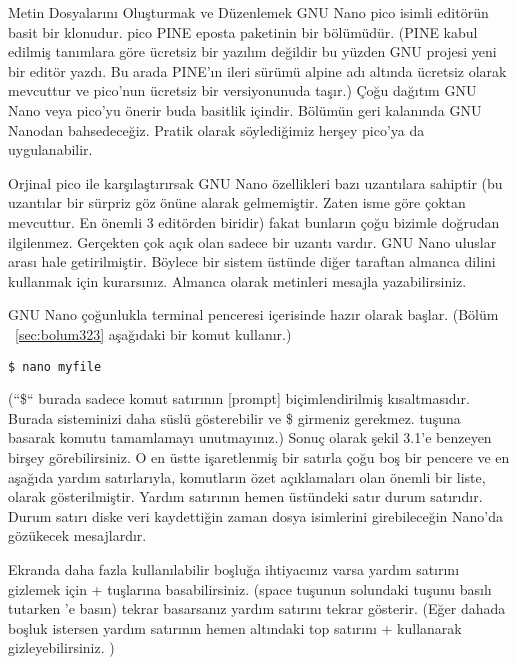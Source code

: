 \begin{section}{Metin Dosyalarını Oluşturmak ve Düzenlemek}
GNU Nano pico isimli editörün basit bir klonudur. pico PINE eposta paketinin bir bölümüdür. (PINE kabul edilmiş tanımlara göre ücretsiz bir yazılım değildir bu yüzden GNU projesi yeni bir editör yazdı. Bu arada PINE’ın ileri sürümü alpine adı altında ücretsiz olarak mevcuttur ve pico’nun ücretsiz bir versiyonunuda taşır.) Çoğu dağıtım GNU Nano veya pico’yu önerir buda basitlik içindir. Bölümün geri kalanında GNU Nanodan bahsedeceğiz. Pratik olarak söylediğimiz herşey pico'ya da uygulanabilir.

Orjinal pico ile karşılaştırırsak GNU Nano özellikleri bazı uzantılara sahiptir (bu uzantılar bir sürpriz göz önüne alarak gelmemiştir. Zaten isme göre çoktan mevcuttur. En önemli 3 editörden biridir) fakat bunların çoğu bizimle doğrudan ilgilenmez. Gerçekten çok açık olan sadece bir uzantı vardır. GNU Nano uluslar arası hale getirilmiştir. Böylece bir sistem üstünde diğer taraftan almanca dilini kullanmak için kurarsınız.  Almanca olarak metinleri mesajla yazabilirsiniz.

GNU Nano çoğunlukla terminal penceresi içerisinde hazır olarak başlar. (Bölüm ~\ref{sec:bolum323} aşağıdaki bir komut kullanır.)

\begin{verbatim}
$ nano myfile
\end{verbatim}

(“\$“ burada sadece komut satırının [prompt] biçimlendirilmiş kısaltmasıdır. Burada sisteminizi daha süslü gösterebilir ve \$ girmeniz gerekmez. \Return tuşuna basarak komutu tamamlamayı unutmayınız.) Sonuç olarak şekil 3.1’e benzeyen birşey görebilirsiniz. O en üstte işaretlenmiş bir satırla çoğu boş bir pencere ve en aşağıda yardım satırlarıyla, komutların özet açıklamaları olan önemli bir liste, olarak gösterilmiştir. Yardım satırının hemen üstündeki satır durum satırıdır. Durum satırı diske veri kaydettiğin zaman dosya isimlerini girebileceğin Nano'da gözükecek mesajlardır. 

Ekranda daha fazla kullanılabilir boşluğa ihtiyacınız varsa yardım satırını gizlemek için \Alt +  tuşlarına basabilirsiniz. (space tuşunun solundaki \Alt tuşunu basılı tutarken ’e basın) tekrar basarsanız yardım satırını tekrar gösterir. (Eğer dahada boşluk istersen yardım satırının hemen altındaki top satırını \Alt +  kullanarak gizleyebilirsiniz. )


\end{section}
